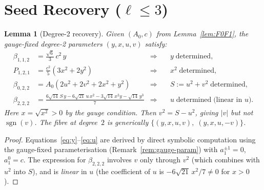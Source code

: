 \documentclass[11pt]{article}
\newtheorem{lemma}[theorem]{Lemma}
\DeclareMathOperator{\sgn}{sgn}
\begin{document}
\section{Seed Recovery ($\ell \le 3$)}

\begin{lemma}[Degree-2 recovery]\label{lem:ell2}
Given $(A_0, c)$ from Lemma~\ref{lem:F0F1}, the gauge-fixed degree-2
parameters $(y, x, u, v)$ satisfy:
\begin{align}
  \beta_{1,1,2} &= \tfrac{\sqrt{6}}{3}\, c^2\, y
    &\Longrightarrow\quad& y \;\text{determined}, \label{eq:y}\\
  P_{1,2,1} &= \tfrac{c^2}{5}(3x^2 + 2y^2)
    &\Longrightarrow\quad& x^2 \;\text{determined}, \label{eq:x2}\\
  \beta_{0,2,2} &= A_0(2u^2 + 2v^2 + 2x^2 + y^2)
    &\Longrightarrow\quad& S := u^2+v^2 \;\text{determined}, \label{eq:S}\\
  \beta_{2,2,2} &= \tfrac{6\sqrt{14}\,S\,y - 6\sqrt{21}\,u\,x^2
    - 3\sqrt{14}\,x^2 y - \sqrt{14}\,y^3}{7}
    &\Longrightarrow\quad& u \;\text{determined}
    \;\text{(linear in $u$)}. \label{eq:u}
\end{align}
Here $x = \sqrt{x^2} > 0$ by the gauge condition.
Then $v^2 = S - u^2$, giving $|v|$ but not $\sgn(v)$.
The fibre at degree~$2$ is generically $\{(y,x,u,v),\; (y,x,u,-v)\}$.
\end{lemma}
\begin{proof}
Equations~\eqref{eq:y}--\eqref{eq:u} are derived by direct symbolic computation
using the gauge-fixed parameterisation (Remark~\ref{rem:gauge-param}) with
$a_1^{\pm 1} = 0$, $a_1^0 = c$.
The expression for $\beta_{2,2,2}$ involves $v$ only through $v^2$
(which combines with $u^2$ into $S$), and is \emph{linear} in $u$
(the coefficient of $u$ is $-6\sqrt{21}\,x^2/7 \ne 0$ for $x > 0$).
\end{proof}
\end{document}
